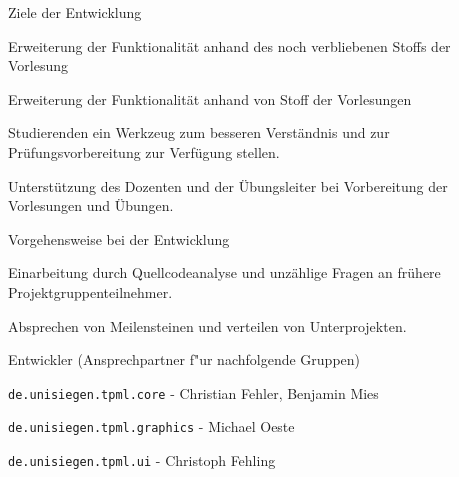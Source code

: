 {
  \begin{itemgroup}{Ziele der Entwicklung}
    \item Erweiterung der Funktionalität anhand des noch verbliebenen
        Stoffs der Vorlesung \glqq\TPONE \grqq
    \item Erweiterung der Funktionalität anhand von Stoff der 
        Vorlesungen \glqq\TPTWO \grqq
    \item Studierenden ein Werkzeug zum besseren Verständnis und zur 
        Prüfungsvorbereitung zur Verfügung stellen.
    \item Unterstützung des Dozenten und der Übungsleiter bei Vorbereitung 
        der Vorlesungen und Übungen.
  \end{itemgroup}
}

{
  \begin{itemgroup}{Vorgehensweise bei der Entwicklung}
    \item Einarbeitung durch Quellcodeanalyse und unzählige Fragen an
        frühere Projektgruppenteilnehmer.
    \item Absprechen von Meilensteinen und verteilen von Unterprojekten.
  \end{itemgroup}

  \begin{itemgroup}{Entwickler (Ansprechpartner f"ur nachfolgende Gruppen)}
    \item {\tt de.unisiegen.tpml.core}      - Christian Fehler, Benjamin Mies
    \item {\tt de.unisiegen.tpml.graphics}  - Michael Oeste
    \item {\tt de.unisiegen.tpml.ui}        - Christoph Fehling
  \end{itemgroup}
}